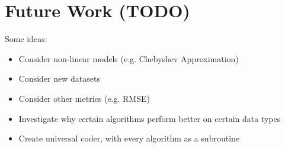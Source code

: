 




\section{Future Work (TODO)}
\label{secX:future}
Some ideas:
\vspace{-10pt}
\begin{itemize}
    \item Consider non-linear models (e.g. Chebyshev Approximation)
    \item Consider new datasets
    \item Consider other metrics (e.g. RMSE)
    \item Investigate why certain algorithms perform better on certain data types
    \item Create universal coder, with every algorithm as a subroutine
\end{itemize}
